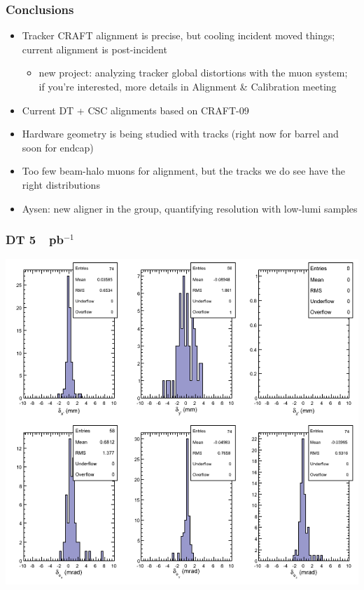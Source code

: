\documentclass[compress]{beamer}
\begin{document}
\begin{frame}
\frametitle{Conclusions}
\begin{itemize}\setlength{\itemsep}{0.5 cm}
\item Tracker CRAFT alignment is precise, but cooling incident moved things; current alignment is post-incident
\begin{itemize}
\item \scriptsize new project: analyzing tracker global distortions with the muon system; \\ if you're interested, more details in Alignment \& Calibration meeting
\end{itemize}

\item Current DT + CSC alignments based on CRAFT-09

\item Hardware geometry is being studied with tracks (right now for
  barrel and soon for endcap)

\item Too few beam-halo muons for alignment, but the tracks we do see
  have the right distributions

\item Aysen: new aligner in the group, quantifying resolution with low-lumi samples

\end{itemize}
\label{numpages}
\end{frame}

\begin{frame}
\frametitle{DT 5~~pb$^{-1}$}
\includegraphics[width=0.8\linewidth]{il05_DT_00.png}
\end{frame}
\end{document}
